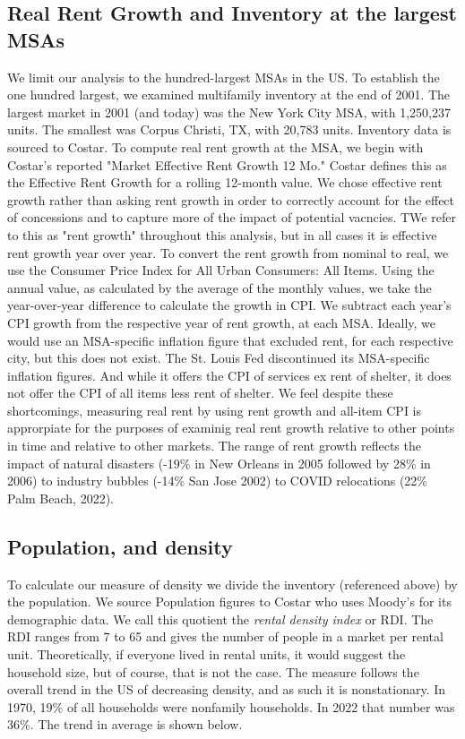 \documentclass[sn-mathphys-num]{sn-jnl}%
\theoremstyle{thmstyleone}%
\theoremstyle{thmstyletwo}%
\theoremstyle{thmstylethree}%
\begin{document}
\subsection{Real Rent Growth and Inventory at the largest MSAs}
We limit our analysis to the hundred-largest MSAs in the US. To establish the one hundred largest, we examined multifamily inventory at the end of 2001. The largest market in 2001 (and today) was the New York City MSA, with 1,250,237 units. The smallest was Corpus Christi, TX, with 20,783 units. Inventory data is sourced to Costar. To compute real rent growth at the MSA, we begin with Costar's reported "Market Effective Rent Growth 12 Mo." Costar defines this as the Effective Rent Growth for a rolling 12-month value. We chose effective rent growth rather than asking rent growth in order to correctly account for the effect of concessions and to capture more of the impact of potential vacncies. TWe refer to this as "rent growth" throughout this analysis, but in all cases it is effective rent growth year over year. To convert the rent growth from nominal to real, we use the Consumer Price Index for All Urban Consumers: All Items. Using the annual value, as calculated by the average of the monthly values, we take the year-over-year difference to calculate the growth in CPI. We subtract each year's CPI growth from the respective year of rent growth, at each MSA. Ideally, we would use an MSA-specific inflation figure that excluded rent, for each respective city, but this does not exist. The St. Louis Fed discontinued its MSA-specific inflation figures. And while it offers the CPI of services ex rent of shelter, it does not offer the CPI of all items less rent of shelter. We feel despite these shortcomings, measuring real rent by using rent growth and all-item CPI is approrpiate for the purposes of examinig real rent growth relative to other points in time and relative to other markets. The range of rent growth reflects the impact of natural disasters (-19\% in New Orleans in 2005 followed by 28\% in 2006) to industry bubbles (-14\% San Jose 2002) to COVID relocations (22\% Palm Beach, 2022). 

\subsection{Population, and density}
To calculate our measure of density we divide the inventory (referenced above) by the population. We source Population figures to Costar who uses Moody's for its demographic data. We call this quotient the \textit{rental density index} or RDI. The RDI ranges from 7 to 65 and gives the number of people in a market per rental unit. Theoretically, if everyone lived in rental units, it would suggest the household size, but of course, that is not the case. The measure follows the overall trend in the US of decreasing density, and as such it is nonstationary. In 1970, 19\% of all households were nonfamily households. In 2022 that number was 36\%. The trend in average is shown below.
\end{document}
